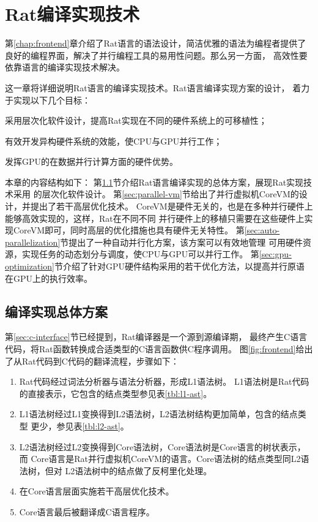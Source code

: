 \chapter{Rat编译实现技术}
第\ref{chap:frontend}章介绍了Rat语言的语法设计，简洁优雅的语法为编程者提供了
良好的编程界面，解决了并行编程工具的易用性问题。那么另一方面，
高效性要依靠语言的编译实现技术解决。

这一章将详细说明Rat语言的编译实现技术。Rat语言编译实现方案的设计，
着力于实现以下几个目标：
\begin{compactitem}
  \item 采用层次化软件设计，提高Rat实现在不同的硬件系统上的可移植性；
  \item 有效开发异构硬件系统的效能，使CPU与GPU并行工作；
  \item 发挥GPU的在数据并行计算方面的硬件优势。
\end{compactitem}

本章的内容结构如下：
第\ref{sec:backend-overview}节介绍Rat语言编译实现的总体方案，展现Rat实现技术采用
的层次化软件设计。
第\ref{sec:parallel-vm}节给出了并行虚拟机CoreVM的设计，并提出了若干高层优化技术。
CoreVM是硬件无关的，也是在多种并行硬件上能够高效实现的，这样，Rat在不同不同
并行硬件上的移植只需要在这些硬件上实现CoreVM即可，同时高层的优化措施也具有硬件无关特性。
第\ref{sec:auto-parallelization}节提出了一种自动并行化方案，该方案可以有效地管理
可用硬件资源，实现任务的动态划分与调度，使CPU与GPU可以并行工作。
第\ref{sec:gpu-optimization}节介绍了针对GPU硬件结构采用的若干优化方法，以提高并行原语
在GPU上的执行效率。

\section{编译实现总体方案}\label{sec:backend-overview}
第\ref{sec:c-interface}节已经提到，Rat编译器是一个源到源编译期，
最终产生C语言代码，将Rat函数转换成合适类型的C语言函数供C程序调用。
图\ref{fig:frontend}给出了从Rat代码到C代码的翻译流程，步骤如下：
\begin{enumerate}
  \item Rat代码经过词法分析器与语法分析器，形成L1语法树。
    L1语法树是Rat代码的直接表示，它包含的结点类型参见表\ref{tbl:l1-ast}。
  \item L1语法树经过L1变换得到L2语法树，L2语法树结构更加简单，包含的结点类型
    更少，参见表\ref{tbl:l2-ast}。
  \item L2语法树经过L2变换得到Core语法树，Core语法树是Core语言的树状表示，而
    Core语言是Rat并行虚拟机CoreVM的语言。Core语法树的结点类型同L2语法树，但对
    L2语法树中的结点做了反柯里化处理。
  \item 在Core语言层面实施若干高层优化技术。
  \item Core语言最后被翻译成C语言程序。
\end{enumerate}

